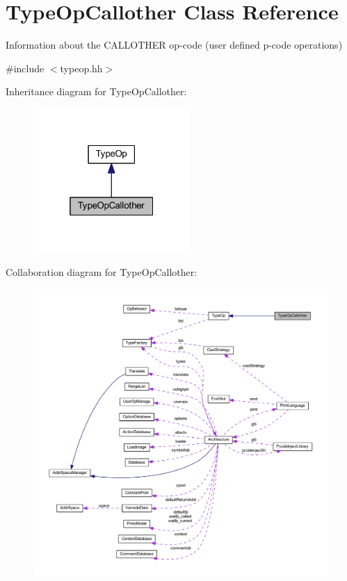 \hypertarget{class_type_op_callother}{}\section{Type\+Op\+Callother Class Reference}
\label{class_type_op_callother}


Information about the C\+A\+L\+L\+O\+T\+H\+ER op-\/code (user defined p-\/code operations)  




{\ttfamily \#include $<$typeop.\+hh$>$}



Inheritance diagram for Type\+Op\+Callother\+:
\nopagebreak
\begin{figure}[H]
\begin{center}
\leavevmode
\includegraphics[width=169pt]{class_type_op_callother__inherit__graph}
\end{center}
\end{figure}


Collaboration diagram for Type\+Op\+Callother\+:
\nopagebreak
\begin{figure}[H]
\begin{center}
\leavevmode
\includegraphics[width=350pt]{class_type_op_callother__coll__graph}
\end{center}
\end{figure}

